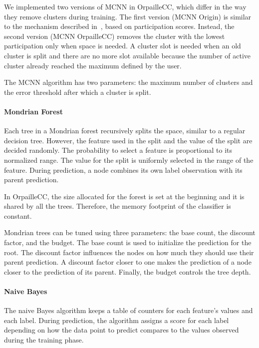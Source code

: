We implemented two versions of MCNN in OrpailleCC,
which differ in the way they remove clusters
during training. The first version (MCNN Origin)
is similar to the mechanism described
in~\cite{mc-nn}, based on participation scores.
Instead, the second version (MCNN OrpailleCC)
removes the cluster with the lowest participation
only when space is needed.  A cluster slot is
needed when an old cluster is split and there are
no more slot available because the number of
active cluster already reached the maximum defined
by the user.

The MCNN algorithm has two
parameters: the maximum number of clusters and the
error threshold after which a cluster is split. 


\paragraph{Mondrian Forest~\cite{mondrian2014}}
Each tree in a Mondrian forest recursively
splits the space, similar to a regular decision tree.
However, the feature used in the split and the value of the
split are decided randomly. The probability to select a feature is 
proportional to its normalized range. The value for the split is
uniformly selected in the range of the feature. During prediction, a node
combines its own label observation  with its parent prediction.

In OrpailleCC, the size allocated for the forest
is set at the beginning and it is shared by all
the trees.  Therefore, the memory footprint of the
classifier is constant.

Mondrian trees can be tuned using three
parameters: the base count, the discount factor,
and the budget. The base count is used to
initialize the prediction for the root. The
discount factor influences the nodes on how much
they should use their parent prediction. A
discount factor closer to one makes the prediction
of a node closer to the prediction of its parent.
Finally, the budget controls the tree depth.

\paragraph{Naive Bayes~\cite{naive_bayes}}
The naive Bayes algorithm keeps a table of
counters for each feature's values and each label.
During prediction, the algorithm assigns a
score for each label depending on how the data
point to predict compares to the values observed
during the training phase.

